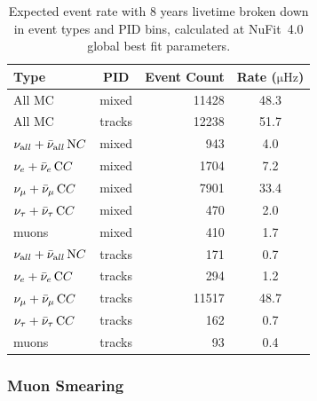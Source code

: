 \begin{table}[htb]
\centering
\caption{Expected event rate with 8 years livetime broken down in event types and PID bins, calculated at NuFit~4.0 global best fit parameters.}
\label{tab:event-rate}
\begin{tabular}{lcrS} \toprule
Type  & PID & Event Count & {Rate ($\mathrm{\mu Hz}$)} \\ \midrule
All MC & mixed  &   11428 &   48.3\\
All MC & tracks &   12238 &   51.7\\ \midrule
${\nu_{\rm all}} + {\bar\nu_{\rm all}} \, {\rm NC} $ & mixed  &     943 &    4.0 \\
${\nu_e} + {\bar\nu_e} \, {\rm CC}                 $ & mixed  &    1704 &    7.2 \\
${\nu_\mu} + {\bar\nu_\mu} \, {\rm CC}             $ & mixed  &    7901 &   33.4 \\
${\nu_\tau} + {\bar\nu_\tau} \, {\rm CC}           $ & mixed  &     470 &    2.0 \\
muons                                                & mixed  &     410 &    1.7 \\
\midrule
${\nu_{\rm all}} + {\bar\nu_{\rm all}} \, {\rm NC} $ & tracks &     171 &    0.7 \\
${\nu_e} + {\bar\nu_e} \, {\rm CC}                 $ & tracks &     294 &    1.2 \\
${\nu_\mu} + {\bar\nu_\mu} \, {\rm CC}             $ & tracks &   11517 &   48.7 \\
${\nu_\tau} + {\bar\nu_\tau} \, {\rm CC}           $ & tracks &     162 &    0.7 \\
muons                                                & tracks &      93 &    0.4 \\
\bottomrule
\end{tabular}
\end{table}


\subsubsection{Muon Smearing}
\label{section:muon_kde}

